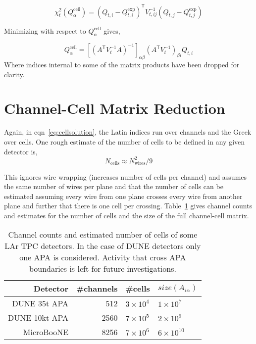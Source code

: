 \documentclass[letter]{article}
\def\mQdec{Q_{t,i}}
\def\mQexp{Q^{\mathrm{exp}}_{t,i}}
\def\mVcov{V_{t,ij}}
\def\mAchc{A_{i\alpha}}
\def\mQcell{Q^{\mathrm{cell}}_\alpha}
\def\Qcell{$\mQcell$\xspace}
\begin{document}

\begin{equation}
  \label{eq:chi2}
  \chi^2_t(\mQcell) = (\mQdec - \mQexp)^\mathsf{T}\mVcov^{-1}(Q_{t,j} - Q^{\mathrm{exp}}_{t,j})
\end{equation}

\noindent Minimizing with respect to \Qcell gives,

\begin{equation}
  \label{eq:cellsolution}
  \mQcell = [(A^\mathsf{T}V_t^{-1}A)^{-1}]_{\alpha\beta}
  (A^\mathsf{T}V_t^{-1})_{\beta i}\mQdec
\end{equation}
Where indices internal to some of the matrix products have been
dropped for clarity.

\section{Channel-Cell Matrix Reduction}
\label{sec:reduction}

Again, in eqn~\ref{eq:cellsolution}, the Latin indices run over
channels and the Greek over cells.
One rough estimate of the number of cells to be defined in any given
detector is,
\begin{equation}
  \label{eq:ncellsestimate}
  N_\mathrm{cells} \approx N_\mathrm{wires}^2/9
\end{equation}

This ignores wire wrapping (increases number of cells per channel) and
assumes the same number of wires per plane and that the number of
cells can be estimated assuming every wire from one plane crosses
every wire from another plane and further that there is one cell per
crossing.
Table~\ref{tab:detectorcounts} gives channel counts and estimates for the
number of cells and the size of the full channel-cell matrix.

\begin{table}[htbp]
  \centering
  \begin{tabular}[h]{|r|r|l|l|}
    \hline
    Detector & \#channels & \#cells & $size(\mAchc)$ \\
    \hline
    \hline
    DUNE 35t APA & 512 & $3\times 10^4$ & $1\times 10^7$\\
    DUNE 10kt APA & 2560 & $7\times 10^5$ & $2\times 10^9$ \\
    MicroBooNE & 8256 & $7\times 10^6$ & $6\times 10^{10}$\\
    \hline
  \end{tabular}
  \caption{Channel counts and estimated number of cells of some LAr
    TPC detectors.
    In the case of DUNE detectors only one APA is considered.
    Activity that cross APA boundaries is left for future investigations.}
  \label{tab:detectorcounts}
\end{table}
\end{document}
